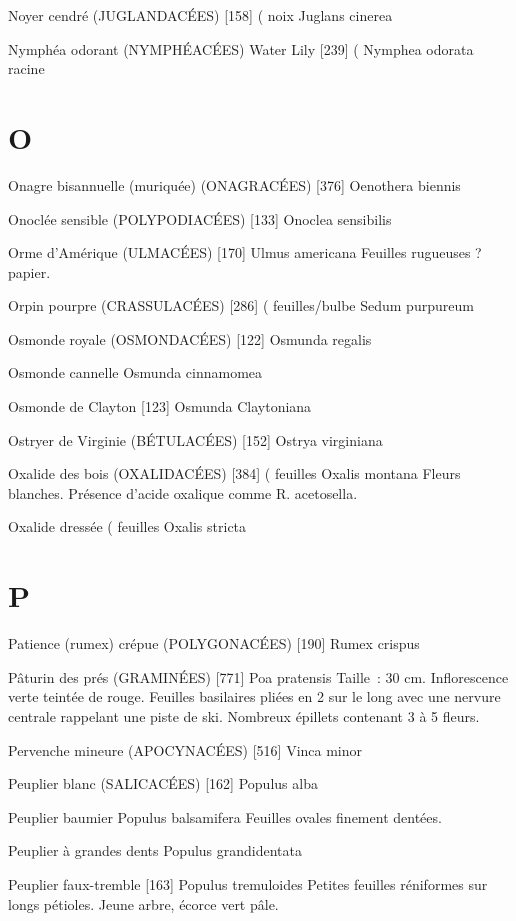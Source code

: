 Noyer cendré (JUGLANDACÉES)  [158]			( noix
				Juglans cinerea

Nymphéa odorant (NYMPHÉACÉES) Water Lily [239]		(
				Nymphea odorata				racine

\chapter*{O}

Onagre bisannuelle (muriquée) (ONAGRACÉES)  [376]
				Oenothera biennis

Onoclée sensible (POLYPODIACÉES)  [133]
				Onoclea sensibilis

Orme d’Amérique (ULMACÉES)  [170]
				Ulmus americana
Feuilles rugueuses ? papier.

Orpin pourpre (CRASSULACÉES)  [286]		( feuilles/bulbe
				Sedum purpureum

Osmonde royale (OSMONDACÉES) [122]
				Osmunda regalis

Osmonde cannelle
				Osmunda cinnamomea

Osmonde de Clayton  [123]
				Osmunda Claytoniana

Ostryer de Virginie (BÉTULACÉES) [152]
				Ostrya virginiana

Oxalide des bois (OXALIDACÉES)  [384]		( feuilles
				Oxalis montana
Fleurs blanches. Présence d’acide oxalique comme R. acetosella.

Oxalide dressée							( feuilles
				Oxalis stricta

\chapter*{P}

Patience (rumex) crépue (POLYGONACÉES)  [190]
				Rumex crispus

Pâturin des prés (GRAMINÉES)  [771]
				Poa pratensis
Taille : 30 cm. Inflorescence verte teintée de rouge.
Feuilles basilaires pliées en 2 sur le long avec une nervure centrale rappelant une piste de ski.
Nombreux épillets contenant 3 à 5 fleurs.

Pervenche mineure (APOCYNACÉES)  [516]
				Vinca minor

Peuplier blanc (SALICACÉES)  [162]
				Populus alba

Peuplier baumier
				Populus balsamifera
Feuilles ovales finement dentées.

Peuplier à grandes dents
				Populus grandidentata

Peuplier faux-tremble  [163]
				Populus tremuloides
Petites feuilles réniformes sur longs pétioles.
Jeune arbre, écorce vert pâle.

